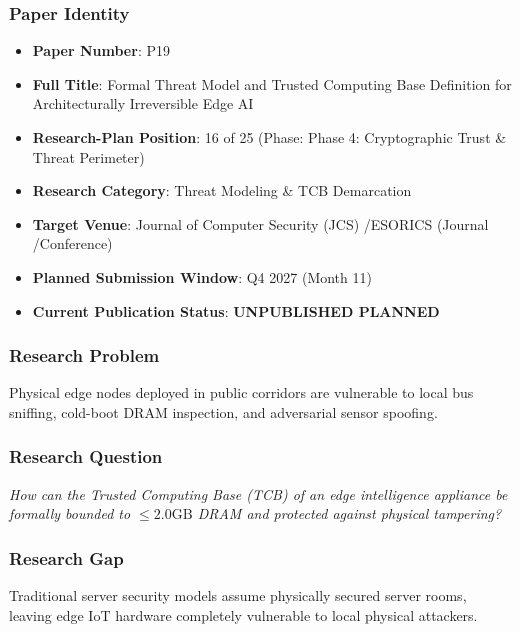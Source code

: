 \documentclass[11pt,letterpaper]{article}
\begin{document}
\subsubsection{Paper Identity}
\begin{itemize}[leftmargin=*]
    \item \textbf{Paper Number}: P19
    \item \textbf{Full Title}: Formal Threat Model and Trusted Computing Base Definition for Architecturally Irreversible Edge AI
    \item \textbf{Research-Plan Position}: 16 of 25 (Phase: Phase 4: Cryptographic Trust \& Threat Perimeter)
    \item \textbf{Research Category}: Threat Modeling \& TCB Demarcation
    \item \textbf{Target Venue}: Journal of Computer Security (JCS) /\allowbreak  ESORICS (Journal /\allowbreak  Conference)
    \item \textbf{Planned Submission Window}: Q4 2027 (Month 11)
    \item \textbf{Current Publication Status}: \textbf{UNPUBLISHED PLANNED}
\end{itemize}

\subsubsection{Research Problem}
Physical edge nodes deployed in public corridors are vulnerable to local bus sniffing, cold-\allowbreak boot DRAM inspection, and adversarial sensor spoofing.

\subsubsection{Research Question}
\begin{tcolorbox}[colback=blue!3!white,colframe=blue!50!black,title=Primary Scientific Question]
\textit{How can the Trusted Computing Base (TCB) of an edge intelligence appliance be formally bounded to $\le 2.0\text{GB}$ DRAM and protected against physical tampering?}
\end{tcolorbox}

\subsubsection{Research Gap}
Traditional server security models assume physically secured server rooms, leaving edge IoT hardware completely vulnerable to local physical attackers.
\end{document}
